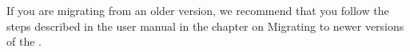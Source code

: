 If you are migrating from an older version, we recommend that you follow the steps described in the user manual in the chapter on Migrating to newer versions of the \gddb{}.












 



